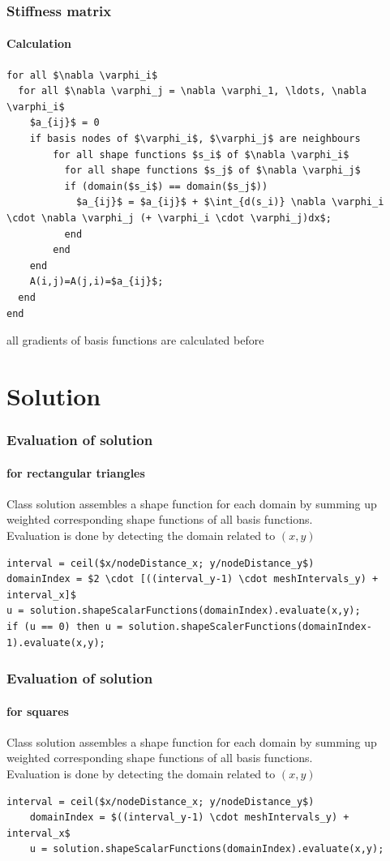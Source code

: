 \documentclass[mathserif]{beamer}
\begin{document}
\begin{frame}[fragile]
\frametitle{Stiffness matrix}
\framesubtitle{Calculation}
\begin{lstlisting}[basicstyle=\tiny, mathescape]
for all $\nabla \varphi_i$
  for all $\nabla \varphi_j = \nabla \varphi_1, \ldots, \nabla \varphi_i$
    $a_{ij}$ = 0
    if basis nodes of $\varphi_i$, $\varphi_j$ are neighbours
		for all shape functions $s_i$ of $\nabla \varphi_i$
		  for all shape functions $s_j$ of $\nabla \varphi_j$
		  if (domain($s_i$) == domain($s_j$))
		    $a_{ij}$ = $a_{ij}$ + $\int_{d(s_i)} \nabla \varphi_i \cdot \nabla \varphi_j (+ \varphi_i \cdot \varphi_j)dx$;
		  end
		end
	end
    A(i,j)=A(j,i)=$a_{ij}$;
  end
end
\end{lstlisting}
all gradients of basis functions are calculated before
\end{frame}
\section{Solution}

\begin{frame}[fragile]
	\frametitle{Evaluation of solution}
	\framesubtitle{for rectangular triangles}
	Class solution assembles a shape function for each domain by summing up weighted corresponding shape functions of all basis functions.\\
	Evaluation is done by detecting the domain related to $(x,y)$
\begin{lstlisting}[basicstyle=\tiny, mathescape]
interval = ceil($x/nodeDistance_x; y/nodeDistance_y$)
domainIndex = $2 \cdot [((interval_y-1) \cdot meshIntervals_y) + interval_x]$
u = solution.shapeScalarFunctions(domainIndex).evaluate(x,y);
if (u == 0) then u = solution.shapeScalerFunctions(domainIndex-1).evaluate(x,y);
\end{lstlisting}
\end{frame}

\begin{frame}[fragile]
	\frametitle{Evaluation of solution}
	\framesubtitle{for squares}
	Class solution assembles a shape function for each domain by summing up weighted corresponding shape functions of all basis functions.\\
	Evaluation is done by detecting the domain related to $(x,y)$
	\begin{lstlisting}[basicstyle=\tiny, mathescape]
	interval = ceil($x/nodeDistance_x; y/nodeDistance_y$)
	domainIndex = $((interval_y-1) \cdot meshIntervals_y) + interval_x$
	u = solution.shapeScalarFunctions(domainIndex).evaluate(x,y);
	\end{lstlisting}
\end{frame}
\end{document}
